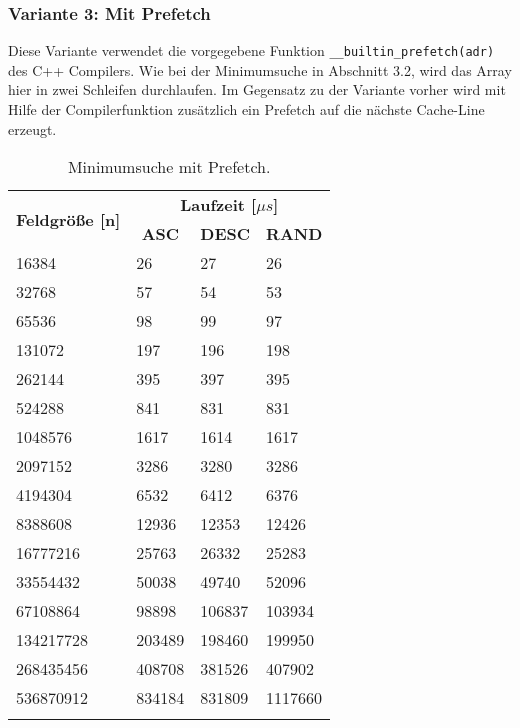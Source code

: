 \newpage

\subsubsection{Variante 3: Mit Prefetch}

Diese Variante verwendet die vorgegebene Funktion \texttt{\_\_builtin\_prefetch(adr)} des C++ Compilers. Wie bei der Minimumsuche in Abschnitt 3.2, wird das Array hier in zwei Schleifen durchlaufen. Im Gegensatz zu der Variante vorher wird mit Hilfe der Compilerfunktion zusätzlich ein Prefetch auf die nächste Cache-Line erzeugt.

\begin{center}
	\begin{longtable}{|p{5cm}|p{3cm}|p{3cm}|p{3cm}|}
		\hline
		
		\multirow{2}{5cm}{\centering \textbf{Feldgröße [n]}} & \multicolumn{3}{|c|}{ \textbf{Laufzeit [$\mu s$]}} \\\cline{2-4}
		& \multicolumn{1}{|c|}{\textbf{ASC}} & \multicolumn{1}{|c|}{\textbf{DESC}} &\multicolumn{1}{|c|}{\textbf{RAND}} \\
		\hhline{|=|=|=|=|}
		
		16384 & 26 & 27 & 26\\
		\hline
		32768 & 57 & 54 & 53\\
		\hline
		65536 & 98 & 99 & 97\\
		\hline
		131072 & 197 & 196 & 198\\
		\hline
		262144 & 395 & 397 & 395\\
		\hline
		524288 & 841 & 831 & 831\\
		\hline
		1048576 & 1617 & 1614 & 1617\\
		\hline
		2097152 & 3286 & 3280 & 3286\\
		\hline
		4194304 & 6532 & 6412 & 6376\\
		\hline
		8388608 & 12936 & 12353 & 12426\\
		\hline
		16777216 & 25763 & 26332 & 25283\\
		\hline
		33554432 & 50038 & 49740 & 52096\\
		\hline
		67108864 & 98898 & 106837 & 103934\\
		\hline
		134217728 & 203489 & 198460 & 199950\\
		\hline
		268435456 & 408708 & 381526 & 407902\\
		\hline
		536870912 & 834184 & 831809 & 1117660\\
		\hline
		
		\caption{Minimumsuche mit Prefetch.}
		\label{tab:minimumsearch-v3}
	\end{longtable}
\end{center}

